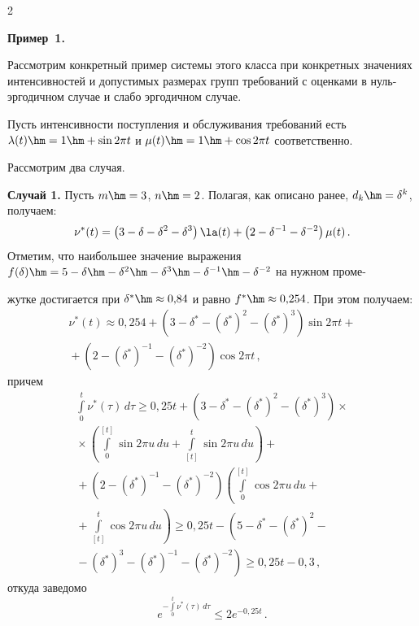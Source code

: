 \begin{multicols}{2}
\medskip

\noindent
\textbf{Пример~1.}

Рассмотрим конкретный пример системы этого класса при конкретных значениях интенсивностей 
и допустимых размерах групп требований с оценками в нуль-эр\-го\-дич\-ном случае и слабо 
эргодичном случае.

Пусть интенсивности поступления и обслуживания требований есть 
$\lambda(t)\hm=1\hm+\sin2\pi t$ и $\mu(t)\hm=1\hm+\cos2\pi t$ соответственно.

Рассмотрим два случая.

{\bf Случай 1.} Пусть $m \hm= 3$, $n\hm=2$. Полагая, как описано ранее,  $d_k\hm=\delta^{k}$, 
получаем:
\begin{equation*}
\nu^*(t) =  \left(3  -\delta -\delta^2-\delta^3\right)\la(t)  
+ \left(2 -\delta^{-1} -\delta^{-2}\right)\mu(t)\,.
\end{equation*}
Отметим, что наибольшее значение выражения $f(\delta)\hm=5-\delta \hm-\delta^2\hm-
\delta^3\hm-\delta^{-1} \hm-\delta^{-2}$
на нужном проме-\linebreak\vspace*{-12pt}

\pagebreak

\noindent
жутке достигается при $\delta^* \hm\approx 0{,}84$ и равно $f^* \hm\approx 0{,}254$.
При этом получаем:
\begin{multline*}
\nu^*(t) \approx 0{,}254 +\left(3  -\delta^* -(\delta^*)^2-(\delta^*)^3\right)\sin2\pi t  +{}\\
{}+ \left(2 -(\delta^*)^{-1} -(\delta^*)^{-2}\right)\cos2\pi t\,,
\end{multline*}
причем
\begin{multline}
\int\limits_0^t\nu^*(\tau)\,d\tau \ge  0{,}25 t  +\left(3  -\delta^* -
(\delta^*)^2-(\delta^*)^3\right)\times{}\\
{}\times 
\left(\int\limits_0^{[t]}\sin2\pi u \, du + 
\int\limits_{[t]}^{t}\sin2\pi u \, du \right) + {} \\ 
{}+\left(2 -(\delta^*)^{-1} -(\delta^*)^{-2}\right)\left(\int\limits_0^{[t]}
\cos 2\pi u \, du +{}\right.\\
\left.{}+ \int\limits_{[t]}^{t}\cos 2\pi u \, du \right) \ge  0{,}25 t  - \left(5  -\delta^* -(\delta^*)^2-{}\right.\\
\left.{}-(\delta^*)^3- (\delta^*)^{-1} 
-(\delta^*)^{-2}\right) \ge 0{,}25t - 0{,}3\,,
\label{3042}
\end{multline}
откуда заведомо
\begin{equation*}
e^{-\int\limits_0^t\nu^*(\tau)\,d\tau} \le 2 e^{- 0{,}25 t}\,.
\end{equation*}


\end{multicols}
